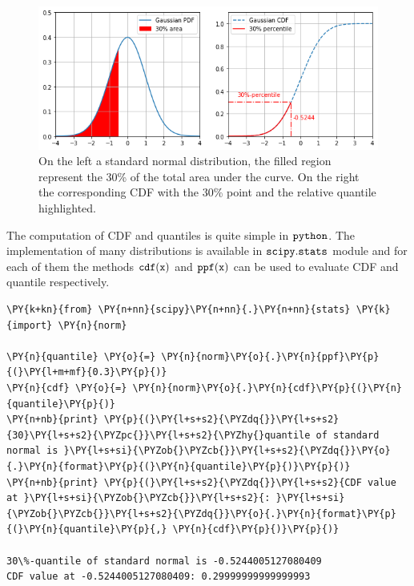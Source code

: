 \begin{figure}[htb]
	\centering
	\includegraphics[width=1.\textwidth]{figures/percentile.png}
	\caption{On the left a standard normal distribution, the filled region represent the 30\% of the total area
		under the curve. On the right the corresponding CDF with the 30\% point and the relative quantile highlighted.}
	\label{fig:percentile}
\end{figure}

The computation of CDF and quantiles is quite simple in \(\tt{python}\).
The implementation of many distributions is available in \(\tt{scipy.stats}\)
module and for each of them the methods \(\tt{cdf(x)}\) and
\(\tt{ppf(x)}\) can be used to evaluate CDF and quantile respectively.

\begin{codebox}
\begin{Verbatim}[commandchars=\\\{\}]
\PY{k+kn}{from} \PY{n+nn}{scipy}\PY{n+nn}{.}\PY{n+nn}{stats} \PY{k}{import} \PY{n}{norm}
		
\PY{n}{quantile} \PY{o}{=} \PY{n}{norm}\PY{o}{.}\PY{n}{ppf}\PY{p}{(}\PY{l+m+mf}{0.3}\PY{p}{)}
\PY{n}{cdf} \PY{o}{=} \PY{n}{norm}\PY{o}{.}\PY{n}{cdf}\PY{p}{(}\PY{n}{quantile}\PY{p}{)}		
\PY{n+nb}{print} \PY{p}{(}\PY{l+s+s2}{\PYZdq{}}\PY{l+s+s2}{30}\PY{l+s+s2}{\PYZpc{}}\PY{l+s+s2}{\PYZhy{}quantile of standard normal is }\PY{l+s+si}{\PYZob{}\PYZcb{}}\PY{l+s+s2}{\PYZdq{}}\PY{o}{.}\PY{n}{format}\PY{p}{(}\PY{n}{quantile}\PY{p}{)}\PY{p}{)}
\PY{n+nb}{print} \PY{p}{(}\PY{l+s+s2}{\PYZdq{}}\PY{l+s+s2}{CDF value at }\PY{l+s+si}{\PYZob{}\PYZcb{}}\PY{l+s+s2}{: }\PY{l+s+si}{\PYZob{}\PYZcb{}}\PY{l+s+s2}{\PYZdq{}}\PY{o}{.}\PY{n}{format}\PY{p}{(}\PY{n}{quantile}\PY{p}{,} \PY{n}{cdf}\PY{p}{)}\PY{p}{)}
		
30\%-quantile of standard normal is -0.5244005127080409
CDF value at -0.5244005127080409: 0.29999999999999993
\end{Verbatim}
\end{codebox}

